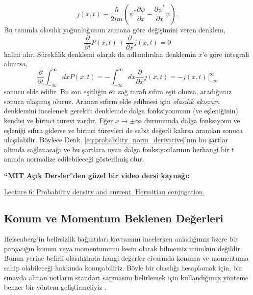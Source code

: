 \documentclass[a4paper,12pt, twoside]{article}
\begin{document}
\begin{equation}
j(x,t)\equiv \dfrac {\hbar }{2im}\left( \psi ^{\ast }\dfrac {\partial \psi }{\partial x}-\dfrac {\partial \psi ^{\ast }}{\partial x}\psi \right).
\label{eq:probability_current}
\end{equation}
Bu tanımla olasılık yoğunluğunun zamana göre değişimini veren denklem,
\begin{equation}
\dfrac {\partial }{\partial t}P\left( x,t\right) +\dfrac {\partial }{\partial x}j\left( x,t\right) =0
\label{eq:continuity_equation}
\end{equation}
halini alır. Süreklilik denklemi olarak da adlandırılan denklemin $x$'e göre integrali alınırsa,
\begin{equation}
\dfrac {\partial }{\partial t}\int ^{\infty }_{-\infty }dxP\left( x,t\right) =-\int ^{\infty }_{-\infty }dx\dfrac {\partial }{\partial x}j\left( x,t\right) = -j(x,t)\bigg|^{\infty}_{-\infty}
\end{equation}
sonucu elde edilir. Bu son eşitliğin en sağ tarafı sıfıra eşit olursa, aradığımız sonuca ulaşımış oluruz. Aranan sıfırın elde edilmesi için \emph{olasılık akısının} denklemini incelemek gerekir: denklemde dalga fonksiyonunun (ve eşleniğinin) kendisi ve birinci türevi vardır. Eğer $x\rightarrow\pm\infty$ durumunda dalga fonksiyonu ve eşleniği sıfıra giderse ve birinci türevleri de sabit değerli kalırsa aranılan sonuca ulaşılabilir. Böylece Denk. \ref{eq:probability_norm_derivative}'nın bu şartlar altında sağlanacağı ve bu şartlara uyan dalga fonksiyonlarının herhangi bir $t$ anında normalize edilebileceği gösterilmiş olur. 

\vspace{18pt}
{\bf ``MIT Açık Dersler"den güzel bir video dersi kaynağı:}

\href{https://ocw.mit.edu/courses/physics/8-04-quantum-physics-i-spring-2016/video-lectures/part-1/}{Lecture 6: Probability density and current. Hermitian conjugation.}


\subsection{Konum ve Momentum Beklenen Değerleri}

Heisenberg'in belirsizlik bağıntıları kavramını incelerken anladığımız üzere bir parçacığın konum veya momentumunu kesin olarak bilmemiz mümkün değildir. Bunun yerine belirli olasılıklarla hangi değerler civarında konuma ve momentuma sahip olabileceği hakkında konuşabiliriz. Böyle bir olasılığı hesaplamak için, bir sınavda alınan notların standart sapmasını belirlemek için kullandığımız yönteme benzer bir yöntem geliştirmeliyiz \cite{book:Towsend}.
\end{document}
